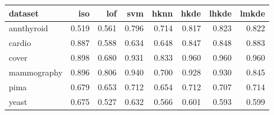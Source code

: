 \begin{tabular}{l|rrr|rrrr}
  \toprule
dataset & iso & lof & svm & hknn & hkde & lhkde & lmkde \\ 
  \midrule
annthyroid & 0.519 & 0.561 & 0.796 & 0.714 & 0.817 & 0.823 & 0.822 \\ 
  cardio & 0.887 & 0.588 & 0.634 & 0.648 & 0.847 & 0.848 & 0.883 \\ 
  cover & 0.898 & 0.680 & 0.931 & 0.833 & 0.960 & 0.960 & 0.960 \\ 
  mammography & 0.896 & 0.806 & 0.940 & 0.700 & 0.928 & 0.930 & 0.845 \\ 
  pima & 0.679 & 0.653 & 0.712 & 0.654 & 0.712 & 0.707 & 0.714 \\ 
  yeast & 0.675 & 0.527 & 0.632 & 0.566 & 0.601 & 0.593 & 0.599 \\ 
   \bottomrule
\end{tabular}
